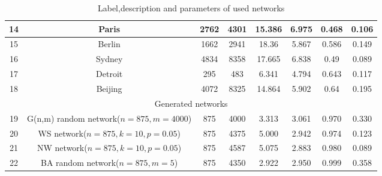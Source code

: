 \documentclass[12pt]{article}
\begin{document}
\begin{table}[ht]
{\begin{tabular}{|c|c|c|c|c|c|c|c|c|}
            \hline
            14&\multicolumn{2}{c|}{Paris}&2762&4301&15.386&6.975&0.468&0.106\\ 
            \hline
            15&\multicolumn{2}{c|}{Berlin}&1662&2941&18.36&5.867&0.586&0.149\\ 
            \hline
            16&\multicolumn{2}{c|}{Sydney}&4834&8358&17.665&6.838&0.49&0.089\\ 
            \hline
            17&\multicolumn{2}{c|}{Detroit}&295&483&6.341&4.794&0.643&0.117\\ 
            \hline
            18&\multicolumn{2}{c|}{Beijing}&4072&8325&14.864&5.902&0.64&0.195\\ 
            \hline
            \multicolumn{9}{|c|}{Generated networks}\\
            \hline
            19&\multicolumn{2}{c|}{G(n,m) random network($n=875,m=4000$)}&875&4000&3.313&3.061&0.970&0.330\\
            \hline
            20&\multicolumn{2}{c|}{WS network($n=875,k=10,p=0.05$)}&875&4375&5.000&2.942&0.974&0.123\\
            \hline
            21&\multicolumn{2}{c|}{NW network($n=875,k=10,p=0.05$)}&875&4587&5.075&2.883&0.980&0.089\\
            \hline
            22&\multicolumn{2}{c|}{BA random network($n=875,m=5$)}&875&4350&2.922&2.950&0.999&0.358\\
            \hline
        \end{tabular}
    }
    \caption{Label,description and parameters of used networks} 
    \label{tb:descriptions}
\end{table}
\end{document}
